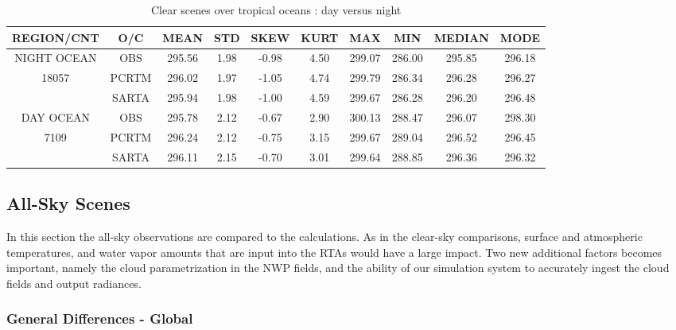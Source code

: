 \documentclass[agupp]{aguplus}              %
\begin{document}
\begin{article}
\begin{center}
\begin{table}[ht]
{\small
\hfill{}
\begin{tabular}{cccccccccc} %
\hline\hline %
  REGION/CNT    & O/C & MEAN  & STD & SKEW & KURT & MAX & MIN & MEDIAN & MODE \\
\hline
NIGHT OCEAN   & OBS   & 295.56 &  1.98  & -0.98 &  4.50 & 299.07 & 286.00 & 295.85 & 296.18 \\
   18057        & PCRTM & 296.02 &  1.97  & -1.05 &  4.74 & 299.79 & 286.34 & 296.28 & 296.27 \\
              & SARTA & 295.94 &  1.98  & -1.00 &  4.59 & 299.67 & 286.28 & 296.20 & 296.48 \\
\hline
DAY OCEAN   & OBS   & 295.78 &  2.12  & -0.67 &  2.90 & 300.13 & 288.47 & 296.07 & 298.30 \\
   7109      & PCRTM & 296.24 &  2.12  & -0.75 &  3.15 & 299.67 & 289.04 & 296.52 & 296.45 \\
            & SARTA & 296.11 &  2.15  & -0.70 &  3.01 & 299.64 & 288.85 & 296.36 & 296.32 \\
\hline %
\end{tabular}}
\hfill{}
\caption{Clear scenes over tropical oceans : day versus night}
\label{table:clear1} %
\end{table}
\end{center}

\subsection{All-Sky Scenes}

In this section the all-sky observations are compared to the
calculations.  As in the clear-sky comparisons, surface and atmospheric
temperatures, and water vapor amounts that are input into the RTAs
would have a large impact. Two new additional factors becomes
important, namely the cloud parametrization in the NWP fields, and the
ability of our simulation system to accurately ingest the cloud fields
and output radiances.

\subsubsection{General Differences - Global}
\label{All-Sky}


\end{article}
\end{document}
